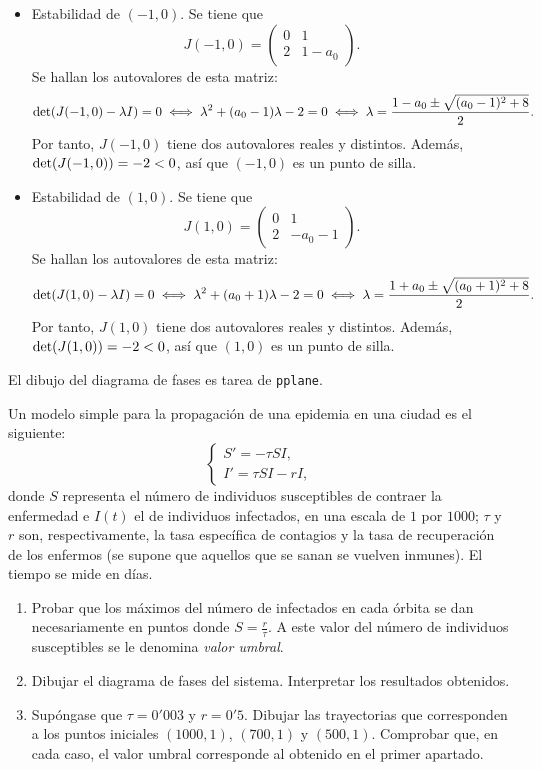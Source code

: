 \documentclass[11pt]{report}
\begin{document}
\begin{solution}
\begin{itemize}
    \item Estabilidad de $(-1,0)$. Se tiene que
    \[J(-1,0)=\left(\begin{array}{cc}
        0 & 1 \\
        2 & 1-a_0
    \end{array}\right).\]
    Se hallan los autovalores de esta matriz:
    \[\textup{det}(J(-1,0)-\lambda I) = 0 \iff \lambda^2+(a_0-1)\lambda-2=0 \iff \lambda = \frac{1-a_0\pm\sqrt{(a_0-1)^2+8}}{2}.\]
    Por tanto, $J(-1,0)$ tiene dos autovalores reales y distintos. Además, $\textup{det}(J(-1,0)) = -2 < 0$, así que $(-1,0)$ es un punto de silla.
    \item Estabilidad de $(1,0)$. Se tiene que
    \[J(1,0)=\left(\begin{array}{cc}
        0 & 1 \\
        2 & -a_0-1
    \end{array}\right).\]
    Se hallan los autovalores de esta matriz:
    \[\textup{det}(J(1,0)-\lambda I) = 0 \iff \lambda^2+(a_0+1)\lambda-2=0 \iff \lambda = \frac{1+a_0\pm\sqrt{(a_0+1)^2+8}}{2}.\]
    Por tanto, $J(1,0)$ tiene dos autovalores reales y distintos. Además, $\textup{det}(J(1,0)) = -2 < 0$, así que $(1,0)$ es un punto de silla.
    \end{itemize}
    El dibujo del diagrama de fases es tarea de \texttt{pplane}.
\end{solution}

\begin{exercise}
    Un modelo simple para la propagación de una epidemia en una ciudad es el siguiente:
    \[\begin{cases}
        S' =-\tau SI, \\
        I' = \tau SI-rI,
    \end{cases}\]
    donde $S$ representa el número de individuos susceptibles de contraer la enfermedad e $I(t)$ el de individuos infectados, en una escala de $1$ por $1000$; $\tau$ y $r$ son, respectivamente, la tasa específica de contagios y la tasa de recuperación de los enfermos (se supone que aquellos que se sanan se vuelven inmunes). El tiempo se mide en días.
    \begin{enumerate}
        \item Probar que los máximos del número de infectados en cada órbita se dan necesariamente en puntos donde $ S = \frac{r}{\tau}$. A este valor del número de individuos susceptibles se le denomina \emph{valor umbral}.
        \item Dibujar el diagrama de fases del sistema. Interpretar los resultados obtenidos.
        \item Supóngase que $\tau = 0'003$ y $r = 0'5$. Dibujar las trayectorias que corresponden a los puntos iniciales $(1000,1)$, $(700,1)$ y $(500,1)$. Comprobar que, en cada caso, el valor umbral corresponde al obtenido en el primer apartado.
    \end{enumerate}
\end{exercise}
\end{document}
